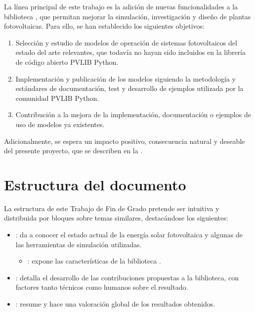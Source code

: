 La línea principal de este trabajo es la adición de nuevas funcionalidades a la biblioteca \pvlibpy{}, que permitan mejorar la simulación, investigación y diseño de plantas fotovoltaicas. Para ello, se han establecido los siguientes objetivos:

\begin{enumerate}

    \item Selección y estudio de modelos de operación de sistemas fotovoltaicos del estado del arte relevantes, que todavía no hayan sido incluidos en la librería de código abierto PVLIB Python.

    \item Implementación y publicación de los modelos siguiendo la metodología y estándares de documentación, test y desarrollo de ejemplos utilizada por la comunidad PVLIB Python.

    \item Contribución a la mejora de la implementación, documentación o ejemplos de uso de modelos ya existentes.

\end{enumerate}

Adicionalmente, se espera un impacto positivo, consecuencia natural y deseable del presente proyecto, que se describen en la .


\section{Estructura del documento} \label{sct:intro_estructura}

La estructura de este Trabajo de Fin de Grado pretende ser intuitiva y distribuida por bloques sobre temas similares, destacándose los siguientes:

\begin{itemize}

    \item {}: da a conocer el estado actual de la energía solar \gls{fotovoltaica} y algunas de las herramientas de \gls{simulación} utilizadas.

          \begin{itemize}
              \item {}: expone las características de la biblioteca \pvlibpy{}.
          \end{itemize}

    \item {}: detalla el desarrollo de las contribuciones propuestas a la biblioteca, con factores tanto técnicos como humanos sobre el resultado.

    \item {}: resume y hace una valoración global de los resultados obtenidos.

\end{itemize}


